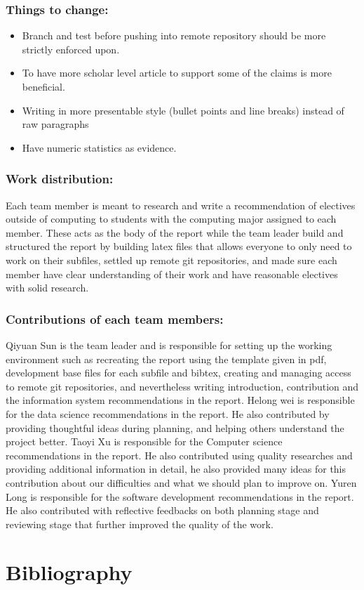 \documentclass{article}
\begin{document}
	\subsubsection{Things to change:}
	\begin{itemize}
		\item Branch and test before pushing into remote repository should be more strictly enforced upon.
		\item To have more scholar level article to support some of the claims is more beneficial.
		\item Writing in more presentable style (bullet points and line breaks) instead of raw paragraphs
		\item Have numeric statistics as evidence.
	\end{itemize}
	
	\subsubsection{Work distribution:}
	Each team member is meant to research and write a recommendation of electives outside of computing to students with the computing major assigned to each member. These acts as the body of the report while the team leader build and structured the report by building latex files that allows everyone to only need to work on their subfiles, settled up remote git repositories, and made sure each member have clear understanding of their work and have reasonable electives with solid research.
	
	\subsubsection{Contributions of each team members:}
	Qiyuan Sun is the team leader and is responsible for setting up the working environment such as recreating the report using the template given in pdf, development base files for each subfile and bibtex, creating and managing access to remote git repositories, and nevertheless writing introduction, contribution and the information system recommendations in the report.
	Helong wei is responsible for the data science recommendations in the report. He also contributed by providing thoughtful ideas during planning, and helping others understand the project better.
	Taoyi Xu is responsible for the Computer science recommendations in the report. He also contributed using quality researches and providing additional information in detail, he also provided many ideas for this contribution about our difficulties and what we should plan to improve on.
	Yuren Long is responsible for the software development recommendations in the report. He also contributed with reflective feedbacks on both planning stage and reviewing stage that further improved the quality of the work.
	\pagebreak
\section{Bibliography}
	\nocite{*}
	
	
\end{document}
